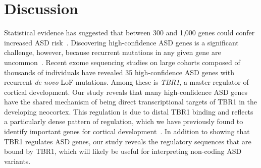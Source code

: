 \section{Discussion}

Statistical evidence has suggested that between 300 and 1,000 genes
could confer increased ASD risk~\citep{Krumm:2014hd}. Discovering
high-confidence ASD genes is a significant challenge, however, because
recurrent mutations in any given gene are uncommon~\citep{Yu:2013im}.
Recent exome sequencing studies on large cohorts composed of thousands
of individuals have revealed 35 high-confidence ASD genes with recurrent
\emph{de novo} LoF mutations. Among these is \emph{TBR1}, a master
regulator of cortical development. Our study reveals that many
high-confidence ASD genes have the shared mechanism of being direct
transcriptional targets of TBR1 in the developing neocortex. This
regulation is due to distal TBR1 binding and reflects a particularly
dense pattern of regulation, which we have previously found to identify
important genes for cortical development~\citep{Wenger:2013jd}. In
addition to showing that TBR1 regulates ASD genes, our study reveals the
regulatory sequences that are bound by TBR1, which will likely be useful
for interpreting non-coding ASD variants.


